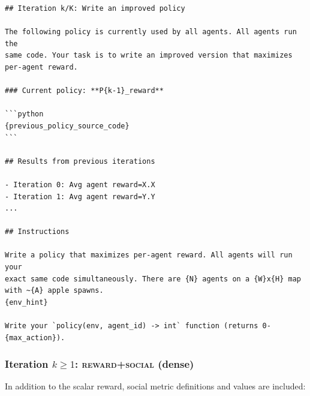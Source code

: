 \documentclass{nextgame2026} %
\begin{document}
\begin{lstlisting}[style=pysmall, caption={User prompt at iteration $k \geq 1$, \textsc{reward-only} mode.}, basicstyle=\ttfamily\tiny]
## Iteration k/K: Write an improved policy

The following policy is currently used by all agents. All agents run the
same code. Your task is to write an improved version that maximizes
per-agent reward.

### Current policy: **P{k-1}_reward**

```python
{previous_policy_source_code}
```

## Results from previous iterations

- Iteration 0: Avg agent reward=X.X
- Iteration 1: Avg agent reward=Y.Y
...

## Instructions

Write a policy that maximizes per-agent reward. All agents will run your
exact same code simultaneously. There are {N} agents on a {W}x{H} map
with ~{A} apple spawns.
{env_hint}

Write your `policy(env, agent_id) -> int` function (returns 0-{max_action}).
\end{lstlisting}

\subsubsection{Iteration $k \geq 1$: \textsc{reward+social} (dense)}

In addition to the scalar reward, social metric definitions and values
are included:
\end{document}
